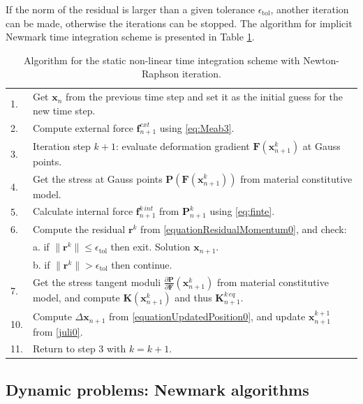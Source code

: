 \documentclass[oneside,11pt,times]{book}
\begin{document}
If the norm of the residual is larger than a given tolerance $\epsilon_{\textrm{tol}}$, another iteration can be made, otherwise the iterations can be stopped. The algorithm for implicit Newmark time integration scheme is presented in Table \ref{tableStatic}.
\begin{table}[h]
 \caption{Algorithm for the static non-linear time integration scheme with Newton-Raphson iteration.}
 \label{tableStatic}
 \begin{tabular}{|p{5mm} p{118mm}|}
 \hline
 1. & Get $\bm{x}_{n}$ from the previous time step and set it as the initial guess for the new time step. \\
 2. & Compute external force $\bm{f}^{ext}_{n+1}$ using  \eqref{eq:Meab3}. \\
 3. & Iteration step $k+1$: evaluate deformation gradient $\bm{F} (\bm{x}^{k}_{n+1})$ at Gauss points. \\
 4. & Get the stress at Gauss points $\bm{P}(\bm{F}(\bm{x}^{k}_{n+1}))$ from material constitutive model. \\
 5. & Calculate internal force $\bm{f}^{k\,int}_{n+1}$ from $\bm{P}_{n+1}^{k}$ using
   \eqref{eq:finte}. \\
 6. & Compute the residual $\bm{r}^{k}$ from \eqref{equationResidualMomentum0}, and check: \\
    & a. if $\|\bm{r}^{k}\| \le \epsilon_{\textrm{tol}}$ then exit. Solution  $\bm{x}_{n+1}$. \\
    & b. if $\|\bm{r}^{k}\| > \epsilon_{\textrm{tol}}$ then continue.  \\
 7. & Get the stress tangent moduli $\frac{\partial \bm{P}}{\partial \bm{F}}(\bm{x}^{k}_{n+1})$ from material constitutive model, and compute $\bm{K}(\bm{x}_{n+1}^{k})$ and thus $\bm{K}^{k\,eq}_{n+1}$. \\
 10. & Compute $\Delta\bm{x}_{n+1}$ from \eqref{equationUpdatedPosition0}, and update $\bm{x}^{k+1}_{n+1}$ from \eqref{juli0}. \\
 11. & Return to step 3 with $k = k+1$. \\
 \hline
 \end{tabular}
\end{table}

\subsection[Dynamic problems]{Dynamic problems: Newmark algorithms}
\end{document}
